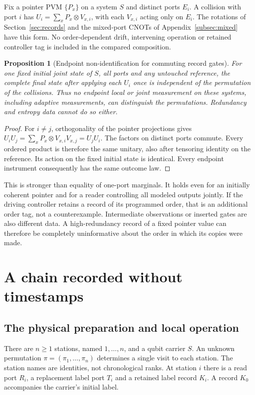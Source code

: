 \documentclass[12pt,a4paper]{article}
\newtheorem{proposition}[theorem]{Proposition}
\begin{document}
Fix a pointer PVM $\{P_x\}$ on a system $S$ and distinct ports $E_i$.
A collision with port $i$ has
$U_i=\sum_xP_x\otimes V_{x,i}$, with each $V_{x,i}$ acting only on
$E_i$. The rotations of Section~\ref{sec:records} and the mixed-port
CNOTs of Appendix~\ref{subsec:mixed} have this form.
No order-dependent drift, intervening operation or retained controller
tag is included in the compared composition.

\begin{proposition}[Endpoint non-identification for commuting record gates]
\label{prop:endpoint-order}
For one fixed initial joint state of $S$, all ports and any untouched
reference, the complete final state after applying each $U_i$ once
is independent of the permutation of the collisions. Thus no endpoint
local or joint measurement on these systems, including adaptive
measurements, can distinguish the permutations. Redundancy and entropy
data cannot do so either.
\end{proposition}
\begin{proof}
For $i\ne j$, orthogonality of the pointer projections gives
$U_iU_j=\sum_xP_x\otimes V_{x,i}V_{x,j}=U_jU_i$.
The factors on distinct ports commute. Every ordered product is
therefore the same unitary, also after tensoring identity on the
reference. Its action on the fixed initial state is identical.
Every endpoint instrument consequently has the same outcome law.
\end{proof}

This is stronger than equality of one-port marginals. It holds even
for an initially coherent pointer and for a reader controlling all
modeled outputs jointly. If the driving controller retains a record
of its programmed order, that is an additional order tag, not a
counterexample. Intermediate observations or inserted gates are
also different data. A high-redundancy record of a fixed pointer
value can therefore be completely uninformative about the order in
which its copies were made.

\section{A chain recorded without timestamps}
\label{sec:label-order}

\subsection{The physical preparation and local operation}

There are $n\ge1$ stations, named $1,\ldots,n$, and a qubit carrier $S$.
An unknown permutation $\pi=(\pi_1,\ldots,\pi_n)$ determines a
single visit to each station. The station names are identities, not
chronological ranks. At station $i$ there is a read port $R_i$,
a replacement label port $T_i$ and a retained label record $K_i$.
A record $K_0$ accompanies the carrier's initial label.
\end{document}
